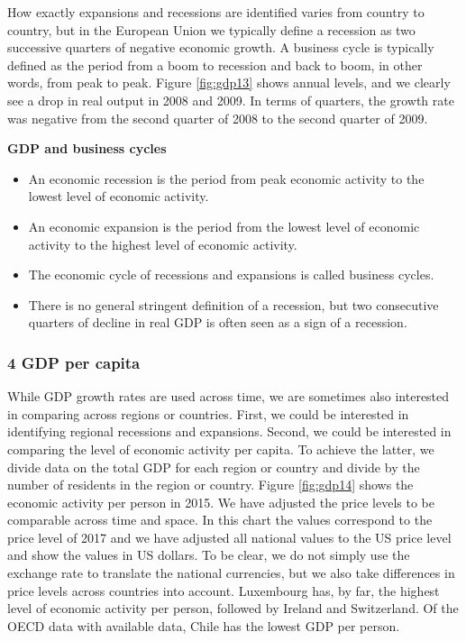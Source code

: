 \documentclass[
]{book}
\providecommand{\tightlist}{%
  \setlength{\itemsep}{0pt}\setlength{\parskip}{0pt}}
\begin{document}
How exactly expansions and recessions are identified varies from country to country, but in the European Union we typically define a recession as two successive quarters of negative economic growth. A business cycle is typically defined as the period from a boom to recession and back to boom, in other words, from peak to peak. Figure \ref{fig:gdp13} shows annual levels, and we clearly see a drop in real output in 2008 and 2009. In terms of quarters, the growth rate was negative from the second quarter of 2008 to the second quarter of 2009.

\begin{myblock}
\textbf{GDP and business cycles}

\begin{itemize}
\tightlist
\item
  An economic recession is the period from peak economic activity to the
  lowest level of economic activity.
\item
  An economic expansion is the period from the lowest level of economic
  activity to the highest level of economic activity.
\item
  The economic cycle of recessions and expansions is called business
  cycles.
\item
  There is no general stringent definition of a recession, but two
  consecutive quarters of decline in real GDP is often seen as a sign of
  a recession.
\end{itemize}
\end{myblock}

\hypertarget{gdp-per-capita}{%
\subsubsection*{4 GDP per capita}\label{gdp-per-capita}}

While GDP growth rates are used across time, we are sometimes also interested in comparing across regions or countries. First, we could be interested in identifying regional recessions and expansions. Second, we could be interested in comparing the level of economic activity per capita. To achieve the latter, we divide data on the total GDP for each region or country and divide by the number of residents in the region or country. Figure \ref{fig:gdp14} shows the economic activity per person in 2015. We have adjusted the price levels to be comparable across time and space. In this chart the values correspond to the price level of 2017 and we have adjusted all national values to the US price level and show the values in US dollars. To be clear, we do not simply use the exchange rate to translate the national currencies, but we also take differences in price levels across countries into account. Luxembourg has, by far, the highest level of economic activity per person, followed by Ireland and Switzerland. Of the OECD data with available data, Chile has the lowest GDP per person.
\end{document}
